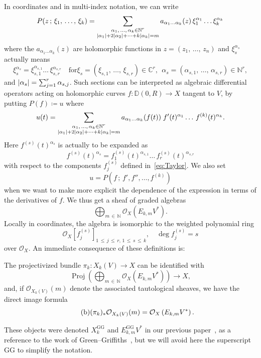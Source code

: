 \documentclass[AHL,Unicode,longabstracts,published]{cedram}
\DeclareMathOperator{\Proj}{Proj}
\DeclarePairedDelimiter{\abs}{\lvert}{\rvert}
\newcommand*\cO{\mathcal{O}}
\newcommand*\bC{\mathbb{C}}
\newcommand*\bD{\mathbb{D}}
\newcommand*\bN{\mathbb{N}}
\let\leq\leqslant
\newcommand*\bydef{\coloneqq}
\begin{document}
In coordinates and in multi-index notation, we can write
\[
P(z\,;\,\xi_1,\,\dotsc,\,\xi_k)=
\sum_{\substack{\alpha_1,\,\dotsc,\,\alpha_k\in\bN^r\\
\abs{\alpha_1}+2\abs{\alpha_2}+\cdots+k\abs{\alpha_k}=m}} a_{\alpha_1\ldots\alpha_k}(z)\,\xi_1^{\alpha_1}\ldots\xi_k^{\alpha_k}
\]
where the $a_{\alpha_1\ldots\alpha_k}(z)$ are holomorphic functions in $z=(z_1,\,\dotsc,\,z_n)$ and $\xi_s^{\alpha_s}$ actually means
\[
\xi_s^{\alpha_s}=\xi_{s,1}^{\alpha_{s,1}}\ldots\,\xi_{s,r}^{\alpha_{s,r}}\quad
\text{for}
\xi_s=(\xi_{s,1},\,\dotsc,\,\xi_{s,r})\in\bC^r,~~
\alpha_s=(\alpha_{s,1},\,\dotsc,\,\alpha_{s,r})\in\bN^r,
\]
and $\abs{\alpha_s}=\sum_{j=1}^r\alpha_{s,j}$. Such sections can be interpreted as algebraic differential operators acting on holomorphic curves $f\colon\bD(0,R)\to X$ tangent to $V$, by putting
$P(f)\bydef u$ where
\[
u(t)=
\sum_{\substack{\alpha_1,\,\dotsc,\,\alpha_k\in\bN^r\\
\abs{\alpha_1}+2\abs{\alpha_2}+\cdots+k\abs{\alpha_k}=m}} a_{\alpha_1\ldots\alpha_k}(f(t))\;f'(t)^{\alpha_1}\ldots\,f^{(k)}(t)^{\alpha_k}.
\]
Here $f^{(s)}(t)^{\alpha_s}$ is actually to be expanded as
\[
f^{(s)}(t)^{\alpha_s}=f_1^{(s)}(t)^{\alpha_{s,1}}\ldots\,f_r^{(s)}(t)^{\alpha_{s,r}}
\]
with respect to the components $f_j^{(s)}$ defined in~\eqref{eq:Taylor}. We also set
\[
u = P\left(f\,;\,f',f'',\dotsc,f^{(k)}\right)
\]
when we want to make more explicit the dependence of the expression in terms of the derivatives of $f$. We thus get a sheaf of graded algebras
\[
\bigoplus_{m\,\in\,\bN}\cO_X\left(E_{k,m}V^*\right).
\]
Locally in coordinates, the algebra is isomorphic to the weighted polynomial ring
\[
\cO_X\left[f_j^{(s)}\right]_{1\,\leq\,j\,\leq\,r,\,1\,\leq\,s\,\leq\,k},\quad
\deg f_j^{(s)}=s
\]
over $\cO_X$. An immediate consequence of these definitions is:

\begin{prop}\label{prop:Xk}
The projectivized bundle $\pi_k\colon X_k(V)\to X$ can be identified with
\[
\tag{a}
\Proj\left(\bigoplus_{m\,\in\,\bN}\cO_X\left(E_{k,m}V^*\right)\right)\to X,
\]
and, if $\cO_{X_k(V)}(m)$ denote the associated tautological sheaves, we have the direct image formula
\[
\tag{b} (\pi_k)_*\smash{\cO_{X_k(V)}(m)}=\cO_X\left(E_{k,m} V^*\right).
\]
\end{prop}

\begin{rema}
These objects were denoted $X_k^{\text{GG}}$ and $E_{k,m}^{\text{GG}} V^*$ in our previous paper~\cite{Dem97}, as a reference to the work of Green--Griffiths~\cite{GG80}, but we will avoid here the superscript GG to simplify the notation.
\end{rema}
\end{document}
